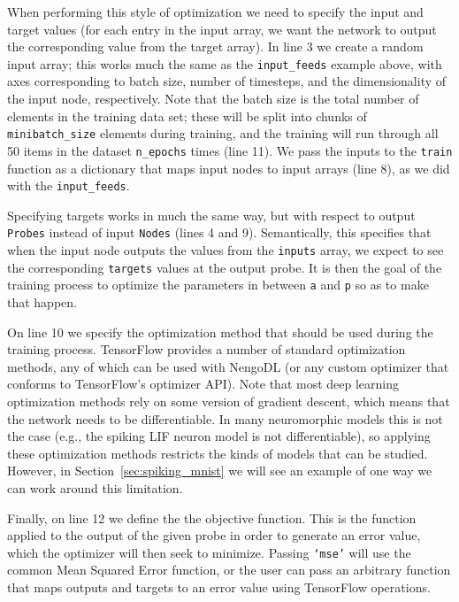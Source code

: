 \documentclass{article}
\begin{document}
\lstset{numbers=left}


When performing this style of optimization we need to specify the input and target values (for each entry in the input array, we want the network to output the corresponding value from the target array).  In line 3 we create a random input array; this works much the same as the \texttt{input\_feeds} example above, with axes corresponding to batch size, number of timesteps, and the dimensionality of the input node, respectively.  Note that the batch size is the total number of elements in the training data set; these will be split into chunks of \texttt{minibatch\_size} elements during training, and the training will run through all 50 items in the dataset \texttt{n\_epochs} times (line 11).  We pass the inputs to the \texttt{train} function as a dictionary that maps input nodes to input arrays (line 8), as we did with the \texttt{input\_feeds}.

Specifying targets works in much the same way, but with respect to output \texttt{Probes} instead of input \texttt{Nodes} (lines 4 and 9).  Semantically, this specifies that when the input node outputs the values from the \texttt{inputs} array, we expect to see the corresponding \texttt{targets} values at the output probe.  It is then the goal of the training process to optimize the parameters in between \texttt{a} and \texttt{p} so as to make that happen.

On line 10 we specify the optimization method that should be used during the training process.  TensorFlow provides a number of standard optimization methods, any of which can be used with NengoDL (or any custom optimizer that conforms to TensorFlow's optimizer API).  Note that most deep learning optimization methods rely on some version of gradient descent, which means that the network needs to be differentiable.  In many neuromorphic models this is not the case (e.g., the spiking LIF neuron model is not differentiable), so applying these optimization methods restricts the kinds of models that can be studied.  However, in Section~\ref{sec:spiking_mnist} we will see an example of one way we can work around this limitation.

Finally, on line 12 we define the the objective function.  This is the function applied to the output of the given probe in order to generate an error value, which the optimizer will then seek to minimize.  Passing \texttt{`mse'} will use the common Mean Squared Error function, or the user can pass an arbitrary function that maps outputs and targets to an error value using TensorFlow operations.
\end{document}
